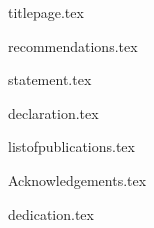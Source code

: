 \documentclass[a4paper,12pt,twoside,openany]{book}
\begin{document}
\thispagestyle{empty}

{titlepage.tex}

\normalsize

\afterpage{
  \null
  \thispagestyle{empty}
  \newpage
}

\singlespacing

{recommendations.tex}

\doublespacing

\clearpage{\thispagestyle{empty}\cleardoublepage}

{statement.tex}

\clearpage{\thispagestyle{empty}\cleardoublepage}

{declaration.tex}

\clearpage{\thispagestyle{empty}\cleardoublepage}


{listofpublications.tex}

\clearpage{\cleardoublepage}


{Acknowledgements.tex}

\clearpage{\thispagestyle{empty}\cleardoublepage}

{dedication.tex}

\clearpage{\thispagestyle{empty}\cleardoublepage}
\end{document}
